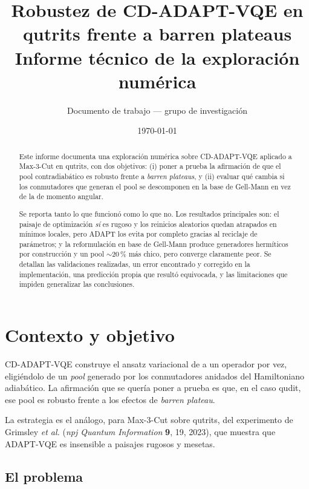 \documentclass[11pt,a4paper]{article}
\title{\textbf{Robustez de CD-ADAPT-VQE en qutrits frente a barren plateaus}\\[0.4em]
\large Informe técnico de la exploración numérica}
\author{Documento de trabajo --- grupo de investigación}
\date{\today}
\begin{document}
\maketitle

\begin{abstract}
\noindent
Este informe documenta una exploración numérica sobre CD-ADAPT-VQE aplicado a
Max-3-Cut en qutrits, con dos objetivos: (i) poner a prueba la afirmación de
que el pool contradiabático es robusto frente a \emph{barren plateaus}, y (ii)
evaluar qué cambia si los conmutadores que generan el pool se descomponen en la
base de Gell-Mann en vez de la de momento angular.

Se reporta tanto lo que funcionó como lo que no. Los resultados principales
son: el paisaje de optimización \emph{sí} es rugoso y los reinicios aleatorios
quedan atrapados en mínimos locales, pero ADAPT los evita por completo gracias
al reciclaje de parámetros; y la reformulación en base de Gell-Mann produce
generadores hermíticos por construcción y un pool $\sim$20\,\% más chico, pero
converge claramente peor. Se detallan las validaciones realizadas, un error
encontrado y corregido en la implementación, una predicción propia que resultó
equivocada, y las limitaciones que impiden generalizar las conclusiones.
\end{abstract}

\tableofcontents

\section{Contexto y objetivo}

CD-ADAPT-VQE construye el ansatz variacional de a un operador por vez,
eligiéndolo de un \emph{pool} generado por los conmutadores anidados del
Hamiltoniano adiabático. La afirmación que se quería poner a prueba es que, en
el caso qudit, ese pool es robusto frente a los efectos de \emph{barren
plateau}.

La estrategia es el análogo, para Max-3-Cut sobre qutrits, del experimento de
Grimsley \emph{et al.} (\emph{npj Quantum Information} \textbf{9}, 19, 2023),
que muestra que ADAPT-VQE es insensible a paisajes rugosos y mesetas.

\subsection{El problema}
\end{document}
